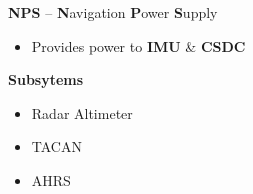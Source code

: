 \begin{tableitemize}
{\begin{subitemize}
\begin{itemize}
        \end{itemize}
        \item \textbf{NPS} -- \textbf{N}avigation \textbf{P}ower \textbf{S}upply
        \begin{itemize}
            \item Provides power to \textbf{IMU} \& \textbf{CSDC}
        \end{itemize}
        \item \textbf{Subsytems}
        \begin{itemize}
            \item Radar Altimeter
            \item TACAN
            \item AHRS
        \end{itemize}
    \end{subitemize}}
\end{tableitemize}

\clearpage

